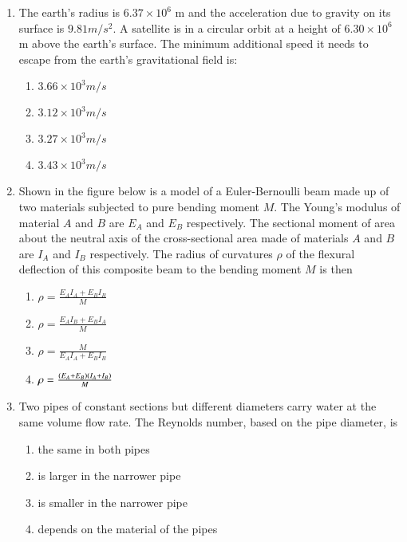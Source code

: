 \documentclass[journal]{IEEEtran}
\begin{document}
\begin{enumerate}
    \item The earth's radius is $6.37 \times 10^6$ m and the acceleration due to gravity on its surface
    is $9.81 m/s^2$. A satellite is in a circular orbit at a height of $6.30 \times 10^6$ m above the
    earth's surface. The minimum additional speed it needs to escape from the earth's gravitational field is:
    \begin{multicols}{2}
        \begin{enumerate}
            \item $3.66 \times 10^3 m/s$
            \item $3.12 \times 10^3 m/s$
            \item $3.27 \times 10^3 m/s$
            \item $3.43 \times 10^3 m/s$
        \end{enumerate}
    \end{multicols}

    \item Shown in the figure below is a model of a Euler-Bernoulli beam made up of two
    materials subjected to pure bending moment $M$. The Young's modulus of material $A$
    and $B$ are $E_A$ and $E_B$ respectively. The sectional moment of area about the neutral
    axis of the cross-sectional area made of materials $A$ and $B$ are $I_A$ and $I_B$
    respectively. The radius of curvatures $\rho$ of the flexural deflection of
    this composite beam to the bending moment $M$ is then

    
    
    \begin{multicols}{4}
        \begin{enumerate}
            \item $\rho = \frac{E_AI_A + E_BI_B}{M}$
            \item $\rho = \frac{E_AI_B + E_BI_A}{M}$
            \item $\rho = \frac{M}{E_AI_A + E_BI_B}$
            \item $\rho = \frac{\left(E_A + E_B\right)\left(I_A + I_B\right)}{M}$
        \end{enumerate}
    \end{multicols}

    \item Two pipes of constant sections but different diameters carry water
    at the same volume flow rate. The Reynolds number, based on the pipe diameter, is

    
    \begin{multicols}{2}
        \begin{enumerate}
            \item the same in both pipes
            \item is larger in the narrower pipe
            \item is smaller in the narrower pipe
            \item depends on the material of the pipes
        \end{enumerate}
    \end{multicols}
    

\end{enumerate}
\end{document}
